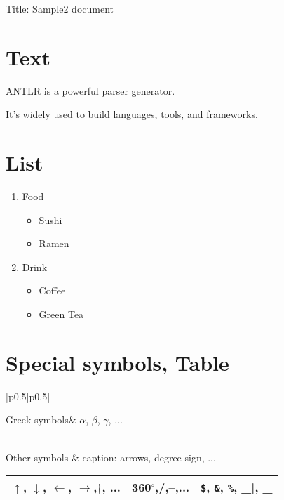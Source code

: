 \documentclass[pdflatex, a4paper, 10pt, jadriver=standard]{bxjsarticle}
\begin{document}
    
        {\Large Title: Sample2 document}\newline\newline
    
\section*{\Large Text}
	ANTLR is a powerful parser generator.
	\par
It's widely used to build languages, tools, and frameworks.
	
\par
\section*{\Large List}
    
\begin{enumerate}
     \item Food
		 
\begin{itemize}
			  \item Sushi
			  
\item Ramen
		
\end{itemize}
     
\item Drink
		 
\begin{itemize}
			  \item Coffee
			  
\item Green Tea
		
\end{itemize}
    
\end{enumerate}
	
	
\section*{\Large Special symbols, Table}
\begin{tabular}{|p{}|p{}|}\hline 
		
			Greek symbols&
			$\alpha$, $\beta$, $\gamma$, ...
		
\\\hline 
			Other symbols
			&
caption: arrows, degree sign, ...\newline 
\begin{tabular}{|p{}|p{}|p{}|}\hline 
				
				
					$\uparrow$, $\downarrow$, $\leftarrow$, $\rightarrow$,$\dagger$, ...
					&
360$^\circ$,/,--,...
					&
\verb|$|, \verb|&|, \verb|%|, \_
			
\\\hline 
\end{tabular}
        
\\\hline 
	\end{tabular}
\par
	
\end{document}
